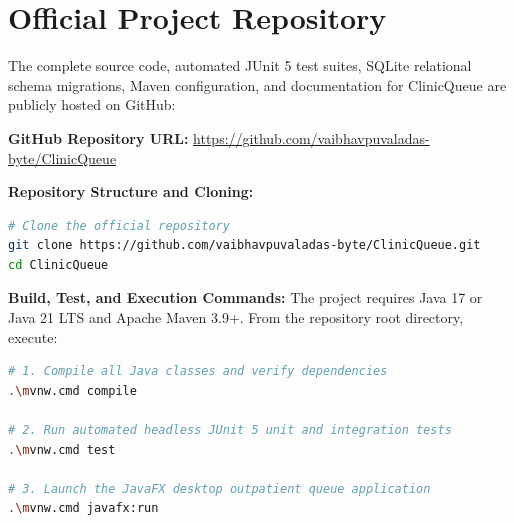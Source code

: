 \documentclass[12pt,a4paper,oneside]{report}
\begin{document}
\section*{Official Project Repository}
The complete source code, automated JUnit 5 test suites, SQLite relational schema migrations, Maven configuration, and documentation for ClinicQueue are publicly hosted on GitHub:
\begin{center}
\textbf{GitHub Repository URL:} \url{https://github.com/vaibhavpuvaladas-byte/ClinicQueue}
\end{center}

\vspace{0.25cm}
\noindent
\textbf{Repository Structure and Cloning:}
\begin{lstlisting}[language=bash, frame=single, backgroundcolor=\color{codebg}]
# Clone the official repository
git clone https://github.com/vaibhavpuvaladas-byte/ClinicQueue.git
cd ClinicQueue
\end{lstlisting}

\vspace{0.25cm}
\noindent
\textbf{Build, Test, and Execution Commands:}
\noindent
The project requires Java 17 or Java 21 LTS and Apache Maven 3.9+. From the repository root directory, execute:

\begin{lstlisting}[language=bash, frame=single, backgroundcolor=\color{codebg}]
# 1. Compile all Java classes and verify dependencies
.\mvnw.cmd compile

# 2. Run automated headless JUnit 5 unit and integration tests
.\mvnw.cmd test

# 3. Launch the JavaFX desktop outpatient queue application
.\mvnw.cmd javafx:run
\end{lstlisting}
\end{document}
